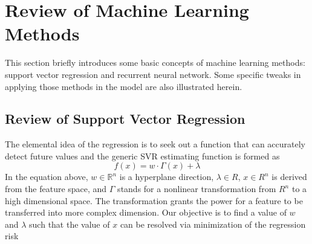 \section{Review of Machine Learning Methods}
\label{sec:machine_learning_review}
This section briefly introduces some basic concepts of machine learning methods:
support vector regression and recurrent neural network. Some specific
tweaks in applying those methods in the model are also illustrated herein.

\subsection{Review of Support Vector Regression}
The elemental idea of the regression is to seek out a function that can
accurately detect future values and the generic SVR estimating function is
formed as
\begin{equation}
f\left( x \right) =  {w \cdot \Gamma \left( x \right)}  + \lambda
\label{eq:1}
\end{equation}
\textcolor{feb18rev}{In the equation above, $w \in {\mathbb{R}^n}$ is a
hyperplane direction, $\lambda \in {R}$, $x \in {R^n}$ is derived from the
feature space, and $\Gamma$ stands for a nonlinear transformation from $R^n$ to
a high dimensional space.} The transformation grants the power for a feature to
be transferred into more complex dimension. Our objective is to find a value of
$w$ and $\lambda$ such that the value of $x$ can be resolved via minimization
of the regression risk

